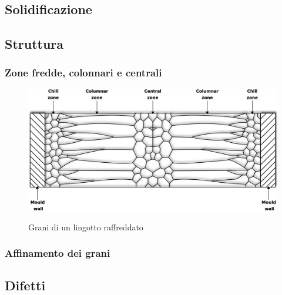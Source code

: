 \documentclass{article}
\begin{document}
    

    \clearpage

        \subsection{Solidificazione\label{Casting_solid}}

        


        \clearpage
        \subsection{Struttura\label{Casting_strutt}}

            \subsubsection{Zone fredde, colonnari e centrali\label{Casting_strutt_zone}}

            \begin{figure}[h!]
                \centering
                 \label{grain_casting}
                \includegraphics[width=\textwidth]{Sources/grain.eps}
                \caption{Grani di un lingotto raffreddato \autocite{Inkscape}}
            \end{figure}

            \clearpage 

            \subsubsection{Affinamento dei grani\label{Casting_strutt_affinamento}}


            \clearpage


        \subsection{Difetti\label{Casting_difetti}}
\end{document}
